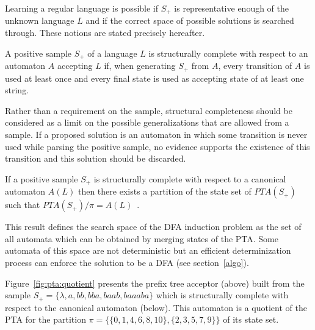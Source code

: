 Learning a regular language is possible if $S_+$ is representative enough of the unknown language $L$ and if the correct space of possible solutions is searched through. These notions are stated precisely hereafter.

\begin{definition} A positive sample $S_+$ of a language $L$ is structurally complete with respect to an automaton $A$ accepting $L$ if, when generating $S_+$ from $A$, every transition of $A$ is used at least once and every final state is used as accepting state of at least one string.
\label{structural:completeness}
\end{definition}

Rather than a requirement on the sample, structural completeness should be considered as a limit on the possible generalizations that are allowed from a sample. If a proposed solution is an automaton in which some transition is never used while parsing the positive sample, no evidence supports the existence of this transition and this solution should be discarded. 

\begin{theorem}
\label{search:theo}
If a positive sample $S_+$ is structurally complete with respect to a canonical automaton $A(L)$ then there exists a partition of the state set of $PTA(S_+)$ such that $PTA(S_+)/\pi = A(L)$~\cite{Dupont:1994}.
\end{theorem} 

This result defines the search space of the DFA induction problem as the set of all automata which can be obtained by merging states of the PTA. Some automata of this space are not deterministic but an efficient determinization process can enforce the solution to be a DFA (see section~\ref{algo}).

Figure~\ref{fig:pta:quotient} presents the prefix tree acceptor (above) built from the sample 
$S_+ = \{\lambda,a,bb,bba,baab,baaaba\}$ which is structurally complete with respect to the canonical automaton (below).
This automaton is a quotient of the PTA for the partition $\pi=\{\{0,1,4,6,8,10\},\{2,3,5,7,9\}\}$ of its state set.

